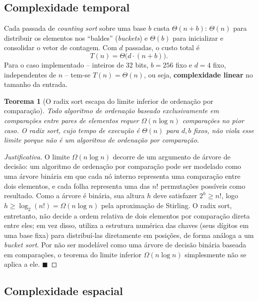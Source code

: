 \documentclass[
	12pt,
	oneside,
	a4paper,
	chapter=TITLE,
	section=TITLE,
	subsection=TITLE,
	subsubsection=TITLE,
	english,
	brazil
]{abntex2}
\theoremstyle{plain}
\newtheorem{teorema}{Teorema}[chapter]
\theoremstyle{remark}
\renewcommand{\_}{\underscoreoriginal\allowbreak}
\begin{document}
\subsection{Complexidade temporal}

Cada passada de \emph{counting sort} sobre uma base $b$ custa $\Theta(n + b)$: $\Theta(n)$ para distribuir os elementos nos ``baldes'' (\emph{buckets}) e $\Theta(b)$ para inicializar e consolidar o vetor de contagem. Com $d$ passadas, o custo total é
\[
T(n) = \Theta\big(d \cdot (n+b)\big).
\]
Para o caso implementado -- inteiros de 32 bits, $b = 256$ fixo e $d = 4$ fixo, independentes de $n$ -- tem-se $T(n) = \Theta(n)$, ou seja, \textbf{complexidade linear} no tamanho da entrada.

\begin{teorema}[O radix sort escapa do limite inferior de ordenação por comparação]
\label{teo:radix-escapa}
Todo algoritmo de ordenação baseado exclusivamente em comparações entre pares de elementos requer $\Omega(n \log n)$ comparações no pior caso. O radix sort, cujo tempo de execução é $\Theta(n)$ para $d, b$ fixos, não viola esse limite porque não é um algoritmo de ordenação por comparação.
\end{teorema}

\begin{proof}[Justificativa]
O limite $\Omega(n \log n)$ decorre de um argumento de árvore de decisão: um algoritmo de ordenação por comparação pode ser modelado como uma árvore binária em que cada nó interno representa uma comparação entre dois elementos, e cada folha representa uma das $n!$ permutações possíveis como resultado. Como a árvore é binária, sua altura $h$ deve satisfazer $2^{h} \ge n!$, logo $h \ge \log_2(n!) = \Omega(n \log n)$ pela aproximação de Stirling. O radix sort, entretanto, não decide a ordem relativa de dois elementos por comparação direta entre eles; em vez disso, utiliza a estrutura numérica das chaves (seus dígitos em uma base fixa) para distribuí-las diretamente em posições, de forma análoga a um \emph{bucket sort}. Por não ser modelável como uma árvore de decisão binária baseada em comparações, o teorema do limite inferior $\Omega(n \log n)$ simplesmente não se aplica a ele. $\blacksquare$
\end{proof}

\subsection{Complexidade espacial}
\end{document}
